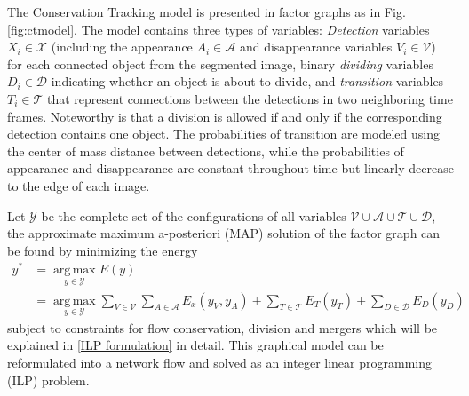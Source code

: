 \documentclass[10pt,twocolumn,letterpaper]{article}
\begin{document}
The Conservation Tracking model is presented in factor graphs as in Fig. \ref{fig:ctmodel}. The model contains three types of variables: \textit{Detection} variables $X_i \in \mathcal{X}$ (including the appearance $A_i \in \mathcal{A}$ and disappearance variables $V_i \in \mathcal{V}$) for each connected object from the segmented image, binary \textit{dividing} variables $D_i \in \mathcal{D}$ indicating whether an object is about to divide, and \textit{transition} variables $T_i \in \mathcal{T}$ that represent connections between the detections in two neighboring time frames. Noteworthy is that a division is allowed if and only if the corresponding detection contains one object. The probabilities of transition are modeled using the center of mass distance between detections, while the probabilities of appearance and disappearance are constant throughout time but linearly decrease to the edge of each image.

Let $\mathcal{Y}$ be the complete set of the configurations of all variables $\mathcal{V}\cup\mathcal{A}\cup\mathcal{T}\cup\mathcal{D}$, the approximate maximum a-posteriori (MAP) solution of the factor graph can be found by minimizing the energy
\scriptsize
\begin{equation*}
\begin{split}
 y^* &= \operatorname*{arg\,max}_{y\in\mathcal{Y}} E(y) \\ 
     &= \operatorname*{arg\,max}_{y\in\mathcal{Y}} \sum\limits_{V\in\mathcal{V}}\sum\limits_{A\in\mathcal{A}} E_x(y_V, y_A) + \sum\limits_{T\in\mathcal{T}} E_T(y_T) + \sum\limits_{D\in\mathcal{D}} E_D(y_D)
\end{split}
\end{equation*}
\normalsize
subject to constraints for flow conservation, division and mergers which will be explained in \ref{ILP formulation} in detail. This graphical model can be reformulated into a network flow and solved as an integer linear programming (ILP) problem.
\end{document}
